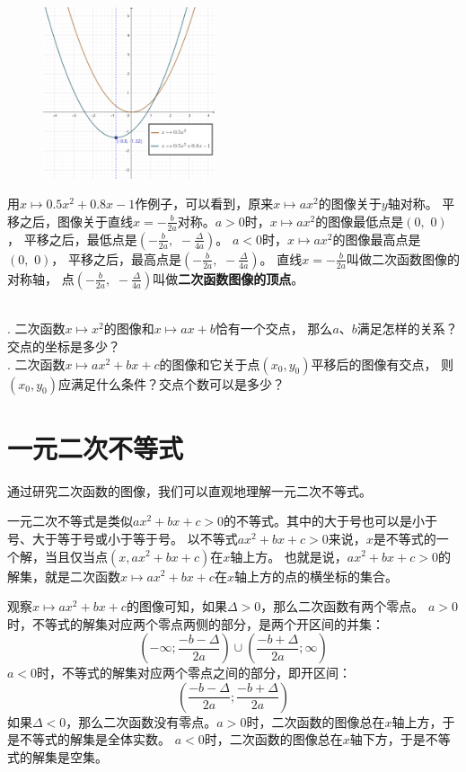 \documentclass[12pt,UTF8]{ctexbook}
\begin{document}
\begin{figure}[ht] %
    \centering
    \includegraphics[width=0.45\textwidth]{tu/二次函数3.png}
\end{figure}

用$x\mapsto 0.5x^2+0.8x-1$作例子，可以看到，原来$x\mapsto ax^2$的图像关于$y$轴对称。
平移之后，图像关于直线$x = -\frac{b}{2a}$对称。$a>0$时，$x\mapsto ax^2$的图像最低点是$(0,\,\,0)$，
平移之后，最低点是$\left(-\frac{b}{2a}, \,\,-\frac{\Delta}{4a}\right)$。
$a<0$时，$x\mapsto ax^2$的图像最高点是$(0,\,\,0)$，
平移之后，最高点是$\left(-\frac{b}{2a}, \,\,-\frac{\Delta}{4a}\right)$。
直线$x = -\frac{b}{2a}$叫做二次函数图像的对称轴，
点$\left(-\frac{b}{2a}, \,\,-\frac{\Delta}{4a}\right)$叫做\textbf{二次函数图像的顶点}。
\begin{xt}\label{xt:5-1-0}
    \mbox{} \\    
    . 二次函数$x\mapsto x^2$的图像和$x\mapsto ax + b$恰有一个交点，
    那么$a$、$b$满足怎样的关系？交点的坐标是多少？\\
    . 二次函数$x\mapsto ax^2+bx+c$的图像和它关于点$(x_0, y_0)$平移后的图像有交点，
    则$(x_0, y_0)$应满足什么条件？交点个数可以是多少？
\end{xt}

\section{一元二次不等式}
通过研究二次函数的图像，我们可以直观地理解一元二次不等式。

一元二次不等式是类似$ax^2 + bx + c > 0$的不等式。其中的大于号也可以是小于号、大于等于号或小于等于号。
以不等式$ax^2 + bx + c > 0$来说，$x$是不等式的一个解，当且仅当点$(x, ax^2 + bx + c)$在$x$轴上方。
也就是说，$ax^2 + bx + c > 0$的解集，就是二次函数$ x \mapsto ax^2 + bx + c$在$x$轴上方的点的横坐标的集合。

观察$x \mapsto ax^2 + bx + c$的图像可知，如果$\Delta>0$，那么二次函数有两个零点。
$a>0$时，不等式的解集对应两个零点两侧的部分，是两个开区间的并集：
$$ (-\infty; \frac{-b - \Delta}{2a}) \cup (\frac{-b +\Delta}{2a}; \infty)$$
$a<0$时，不等式的解集对应两个零点之间的部分，即开区间：
$$ (\frac{-b - \Delta}{2a}; \frac{-b +\Delta}{2a}) $$
如果$\Delta<0$，那么二次函数没有零点。$a>0$时，二次函数的图像总在$x$轴上方，于是不等式的解集是全体实数。
$a<0$时，二次函数的图像总在$x$轴下方，于是不等式的解集是空集。
\end{document}
